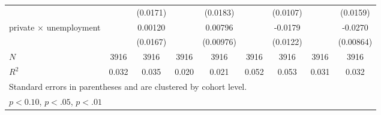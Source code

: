 \begin{table}[ht]
{\begin{tabular}{l*{8}{c}}
            &                     &    (0.0171)         &                     &    (0.0183)         &                     &    (0.0107)         &                     &    (0.0159)         \\
[1em]
private $\times$ unemployment&                     &     0.00120         &                     &     0.00796         &                     &     -0.0179         &                     &     -0.0270\sym{**} \\
            &                     &    (0.0167)         &                     &   (0.00976)         &                     &    (0.0122)         &                     &   (0.00864)         \\
\hline
\(N\)       &        3916         &        3916         &        3916         &        3916         &        3916         &        3916         &        3916         &        3916         \\
\(R^{2}\)   &       0.032         &       0.035         &       0.020         &       0.021         &       0.052         &       0.053         &       0.031         &       0.032         \\
\hline\hline
\multicolumn{9}{l}{\footnotesize Standard errors in parentheses and are clustered by cohort level.}\\
\multicolumn{9}{l}{\footnotesize \sym{*} \(p<0.10\), \sym{**} \(p<.05\), \sym{***} \(p<.01\)}\\
\end{tabular}%
}
\end{table}